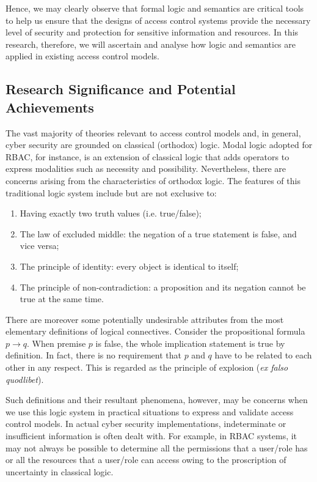 \documentclass{article}
\begin{document}
Hence, we may clearly observe that formal logic and semantics are critical tools to help us ensure that the designs of access control systems provide the necessary level of security and protection for sensitive information and resources. In this research, therefore, we will ascertain and analyse how logic and semantics are applied in existing access control models.

\subsection*{Research Significance and Potential Achievements}

The vast majority of theories relevant to access control models and, in general, cyber security are grounded on classical (orthodox) logic. Modal logic adopted for RBAC, for instance, is an extension of classical logic that adds operators to express modalities such as necessity and possibility. Nevertheless, there are concerns arising from the characteristics of orthodox logic. The features of this traditional logic system include but are not exclusive to:\cite{classical-logic}
\begin{enumerate}
    \item Having exactly two truth values (i.e. true/false);
    \item The law of excluded middle: the negation of a true statement is false, and vice versa;
    \item The principle of identity: every object is identical to itself;
    \item The principle of non-contradiction: a proposition and its negation cannot be true at the same time.
\end{enumerate}

There are moreover some potentially undesirable attributes from the most elementary definitions of logical connectives. Consider the propositional formula $p \to q$. When premise $p$ is false, the whole implication statement is true by definition. In fact, there is no requirement that $p$ and $q$ have to be related to each other in any respect. This is regarded as the principle of explosion (\textit{ex falso quodlibet}).

Such definitions and their resultant phenomena, however, may be concerns when we use this logic system in practical situations to express and validate access control models. In actual cyber security implementations, indeterminate or insufficient information is often dealt with. For example, in RBAC systems, it may not always be possible to determine all the permissions that a user/role has or all the resources that a user/role can access owing to the proscription of uncertainty in classical logic.
\end{document}
